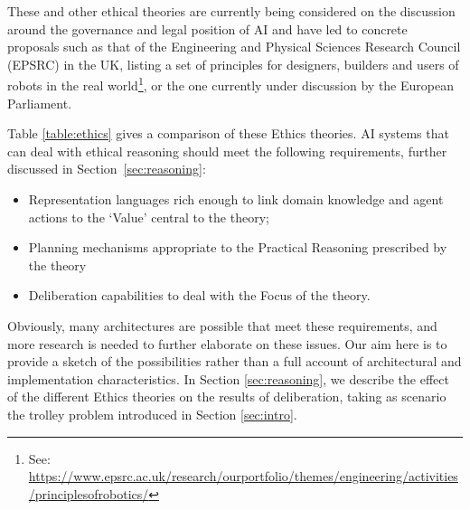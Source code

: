 \documentclass[twocolumn]{article}
\begin{document}
These and other ethical theories are currently being considered on the discussion around the governance and legal position of AI 
and have led to concrete proposals such as that of the Engineering and Physical Sciences Research Council (EPSRC)  in the UK, listing a set of principles for designers, builders and users of robots in the real world\footnote{See: \url{https://www.epsrc.ac.uk/research/ourportfolio/themes/engineering/activities/principlesofrobotics/}}, or the one currently under discussion by the European Parliament. 

Table \ref{table:ethics} gives a comparison of these Ethics theories. AI systems that can deal with ethical reasoning should meet the following requirements, further discussed in Section~\ref{sec:reasoning}:
\begin{itemize}
\item Representation languages rich enough to link domain knowledge and agent actions to the `Value' central to the theory; 
\item Planning mechanisms appropriate to the Practical Reasoning prescribed by the theory
\item Deliberation capabilities to deal with the Focus of the theory.
\end{itemize}
Obviously, many architectures are possible that meet these requirements, and more research is needed to further elaborate on these issues. Our aim here is to provide a sketch of the possibilities rather than a full account of architectural and implementation characteristics. In  Section \ref{sec:reasoning}, we describe the effect of the different Ethics theories on the results of deliberation, taking as scenario the trolley problem introduced in Section \ref{sec:intro}. 
\end{document}
